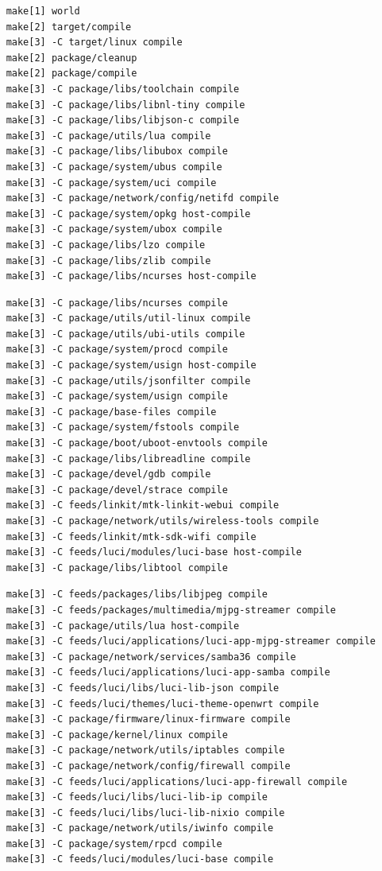 \documentclass{beamer}
\begin{document}
\begin{frame}[fragile]
  \begin{lstlisting}
    make[1] world
    make[2] target/compile
    make[3] -C target/linux compile
    make[2] package/cleanup
    make[2] package/compile
    make[3] -C package/libs/toolchain compile
    make[3] -C package/libs/libnl-tiny compile
    make[3] -C package/libs/libjson-c compile
    make[3] -C package/utils/lua compile
    make[3] -C package/libs/libubox compile
    make[3] -C package/system/ubus compile
    make[3] -C package/system/uci compile
    make[3] -C package/network/config/netifd compile
    make[3] -C package/system/opkg host-compile
    make[3] -C package/system/ubox compile
    make[3] -C package/libs/lzo compile
    make[3] -C package/libs/zlib compile
    make[3] -C package/libs/ncurses host-compile
  \end{lstlisting}
\end{frame}

\begin{frame}[fragile]
  \begin{lstlisting}
    make[3] -C package/libs/ncurses compile
    make[3] -C package/utils/util-linux compile
    make[3] -C package/utils/ubi-utils compile
    make[3] -C package/system/procd compile
    make[3] -C package/system/usign host-compile
    make[3] -C package/utils/jsonfilter compile
    make[3] -C package/system/usign compile
    make[3] -C package/base-files compile
    make[3] -C package/system/fstools compile
    make[3] -C package/boot/uboot-envtools compile
    make[3] -C package/libs/libreadline compile
    make[3] -C package/devel/gdb compile
    make[3] -C package/devel/strace compile
    make[3] -C feeds/linkit/mtk-linkit-webui compile
    make[3] -C package/network/utils/wireless-tools compile
    make[3] -C feeds/linkit/mtk-sdk-wifi compile
    make[3] -C feeds/luci/modules/luci-base host-compile
    make[3] -C package/libs/libtool compile
  \end{lstlisting}
\end{frame}

\begin{frame}[fragile]
  \begin{lstlisting}
    make[3] -C feeds/packages/libs/libjpeg compile
    make[3] -C feeds/packages/multimedia/mjpg-streamer compile
    make[3] -C package/utils/lua host-compile
    make[3] -C feeds/luci/applications/luci-app-mjpg-streamer compile
    make[3] -C package/network/services/samba36 compile
    make[3] -C feeds/luci/applications/luci-app-samba compile
    make[3] -C feeds/luci/libs/luci-lib-json compile
    make[3] -C feeds/luci/themes/luci-theme-openwrt compile
    make[3] -C package/firmware/linux-firmware compile
    make[3] -C package/kernel/linux compile
    make[3] -C package/network/utils/iptables compile
    make[3] -C package/network/config/firewall compile
    make[3] -C feeds/luci/applications/luci-app-firewall compile
    make[3] -C feeds/luci/libs/luci-lib-ip compile
    make[3] -C feeds/luci/libs/luci-lib-nixio compile
    make[3] -C package/network/utils/iwinfo compile
    make[3] -C package/system/rpcd compile
    make[3] -C feeds/luci/modules/luci-base compile
  \end{lstlisting}
\end{frame}
\end{document}
